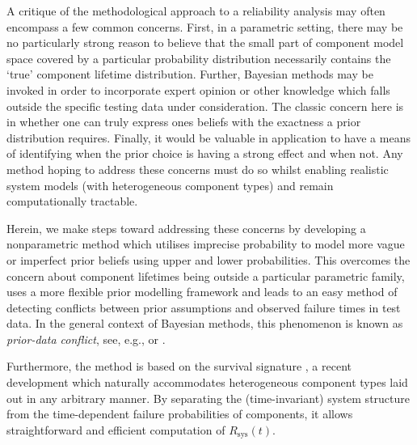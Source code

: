 \documentclass[12pt, a4paper]{elsarticle}
\newcommand{\Rsys}{R_\text{sys}}
\def\Tsys{T_\text{sys}}
\begin{document}
A critique of the methodological approach to a reliability 
analysis may often encompass a few common concerns.
First, in a parametric 
setting, there may be no particularly strong reason to
believe that the small part of component model
space covered by a particular probability distribution 
necessarily contains the `true' component lifetime distribution.
Further, Bayesian methods may be invoked in order to 
incorporate expert opinion or other knowledge which falls
outside the specific testing data under consideration.  The 
classic concern here is in whether one can truly express 
ones beliefs with the exactness a prior distribution requires.  Finally,
it would be valuable in application to have a means of identifying when the
prior choice is having a strong effect and when not.  Any method 
hoping to address these concerns must do so whilst enabling 
realistic system models (with heterogeneous component types)
and remain computationally tractable.

Herein, we make steps toward addressing these concerns by developing
a nonparametric method which utilises imprecise probability \cite{itip,1991:walley}
to model more vague or imperfect prior beliefs using
upper and lower probabilities.  This overcomes the concern
about component lifetimes being outside a particular 
parametric family, uses a more flexible prior modelling 
framework and leads to an easy method of detecting 
conflicts between prior assumptions and observed failure times in test data.
In the general context of Bayesian methods,
this phenomenon is known as \emph{prior-data conflict},
see, e.g., \cite{2006:evans} or \cite{2015:bickel}.

Furthermore, the method is based on the survival signature \cite{2012:survsign},
a recent development which naturally accommodates 
heterogeneous component types laid out in any arbitrary manner.
By separating the (time-invariant) system structure from the time-dependent failure probabilities of components,
it allows straightforward and efficient computation of $\Rsys(t)$.
\end{document}

